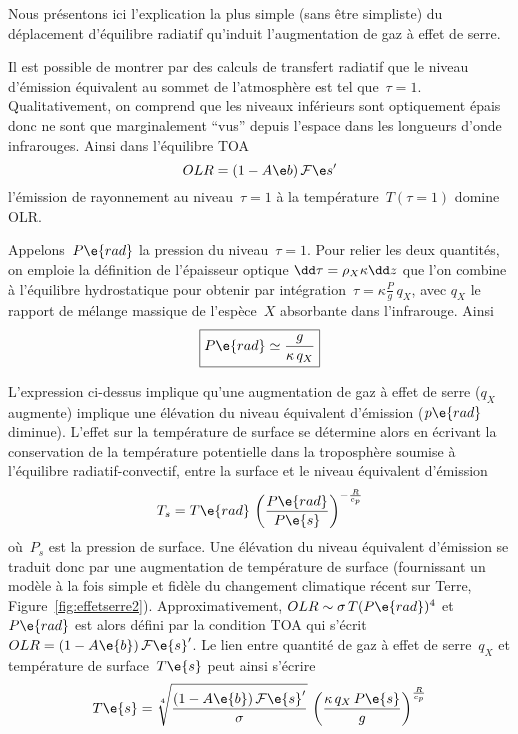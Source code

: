 



\sk
Nous présentons ici l'explication la plus simple (sans être simpliste) du déplacement
d'équilibre radiatif qu'induit l'augmentation de gaz à effet de serre.

\sk
Il est possible de montrer par des calculs de transfert radiatif que le niveau
d'émission équivalent au sommet de l'atmosphère est tel que~$\tau = 1$.
Qualitativement, on comprend que les niveaux inférieurs sont optiquement
épais donc ne sont que marginalement ``vus'' depuis l'espace dans les longueurs d'onde infrarouges.
Ainsi dans l'équilibre TOA
\[ \TOA \] 
\noindent l'émission de rayonnement au niveau~$\tau=1$ 
à la température~$T(\tau=1)$ domine OLR.

\sk
Appelons~$P\e{rad}$ la pression du niveau~$\tau=1$. 
Pour relier
les deux quantités, on emploie la définition de l'épaisseur optique
$\EO$ que l'on combine
à l'équilibre hydrostatique pour obtenir
par intégration~$\tau = \kappa \frac{P}{g} \, q_X$,
avec $q_X$ le rapport de mélange massique 
de l'espèce~$X$ absorbante dans l'infrarouge.
Ainsi
\[ \boxed{ P\e{rad} \simeq \frac{g}{\kappa \, q_X} } \]


\sk
L'expression ci-dessus implique qu'une augmentation de
gaz à effet de serre ($q_X$ augmente) implique une 
élévation du niveau équivalent d'émission
($p\e{rad}$ diminue).
L'effet sur la température de surface se détermine alors
en écrivant la conservation de la température potentielle
dans la troposphère soumise à l'équilibre radiatif-convectif,
entre la surface et le niveau équivalent d'émission
\[ T_s = T\e{rad} \, \left( \frac{P\e{rad}}{P\e{s}} \right)^{-\frac{R}{c_p}} \]
\noindent où~$P_s$ est la pression de surface.
Une élévation du niveau équivalent d'émission
se traduit donc par une augmentation
de température de surface (fournissant
un modèle à la fois simple et fidèle du 
changement climatique récent sur Terre, Figure~\ref{fig:effetserre2}). 
Approximativement, $OLR \sim \sigma \, T(P\e{rad})^4$
et~$P\e{rad}$ est alors défini par la 
condition TOA qui s'écrit~$OLR = (1-A\e{b}) \, \mathcal{F}\e{s}'$.
Le lien entre quantité de gaz à effet de serre~$q_X$
et température de surface~$T\e{s}$ peut ainsi s'écrire
\[ T\e{s} = \sqrt[4]{\frac{(1-A\e{b}) \, \mathcal{F}\e{s}'}{\sigma}} \, \left( \frac{\kappa \, q_X \,P\e{s}}{g} \right)^{\frac{R}{c_p}} \]

